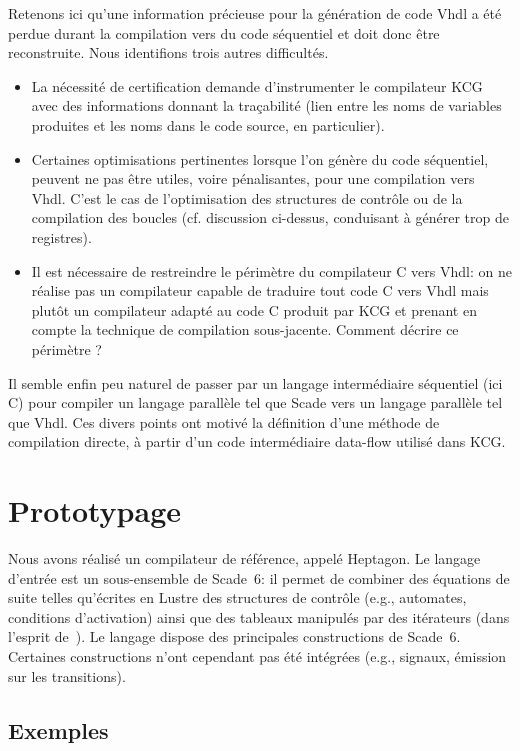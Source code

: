 \documentclass[a4paper]{article}
\newcommand{\LANG}{{\sc Heptagon}}
\newcommand{\lustre}{{\sc Lustre}}
\newcommand{\scade}{{\sc Scade}}
\newcommand{\scadesix}{{\sc Scade~6}}
\newcommand{\vhdl}{{\sc Vhdl}}
\begin{document}
Retenons ici qu'une information précieuse pour la génération
de code \vhdl{} a été perdue durant la compilation vers du code séquentiel et
doit donc être reconstruite. Nous identifions trois autres
difficultés.
\begin{itemize}
\item La nécessité de certification demande d'instrumenter le
  compilateur KCG avec des informations donnant la tra\c{c}abilité (lien
  entre les noms de variables produites et les noms dans le code
  source, en particulier).
\item Certaines optimisations pertinentes lorsque l'on génère du code
  séquentiel, peuvent ne pas être utiles, voire pénalisantes, pour une
  compilation vers \vhdl{}. C'est le cas de l'optimisation des structures
  de contrôle ou de la compilation des boucles (cf. discussion
  ci-dessus, conduisant à générer trop de registres).
\item Il est nécessaire de restreindre le périmètre du compilateur C
  vers \vhdl{}: on ne réalise pas un compilateur capable de traduire tout
  code C vers \vhdl{} mais plutôt un compilateur adapté au code C produit
  par KCG et prenant en compte la technique de compilation
  sous-jacente. Comment décrire ce périmètre ?
\end{itemize}

Il semble enfin peu naturel de passer par un langage
  intermédiaire séquentiel (ici C) pour compiler un langage parallèle
  tel que \scade{} vers un langage parallèle tel que \vhdl. Ces divers points
ont motivé la définition d'une méthode de compilation directe, à partir d'un
code intermédiaire data-flow utilisé dans KCG.

\section{Prototypage}
Nous avons réalisé un compilateur de référence, appelé \LANG{}. Le
langage d'entrée est un sous-ensemble de \scadesix: il permet de
combiner des équations de suite telles qu'écrites en \lustre{} des
structures de contrôle (e.g., automates, conditions d'activation)
ainsi que des tableaux manipulés par des itérateurs (dans l'esprit
de~\cite{lucy:genie00,morel-07-jes}). Le langage dispose des
principales constructions de \scadesix. Certaines constructions n'ont
cependant pas été intégrées (e.g., signaux, émission sur les
transitions).

\subsection{Exemples}
\end{document}
